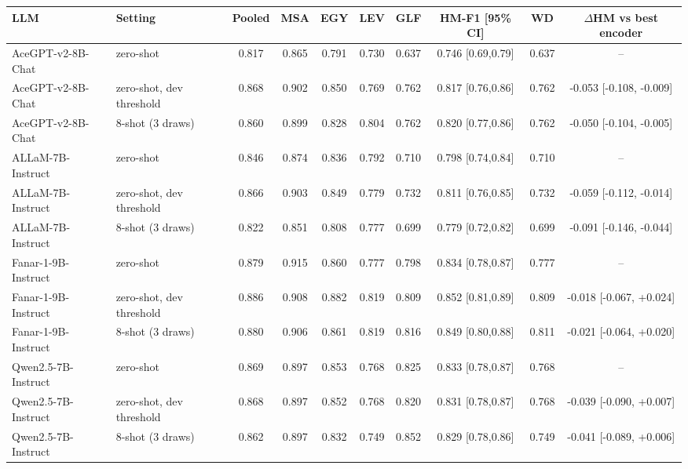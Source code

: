 \begin{tabular}{llccccccc|c}
\toprule
\textbf{LLM} & \textbf{Setting} & Pooled & MSA & EGY & LEV & GLF & HM-F1 [95\% CI] & WD & $\Delta$HM vs best encoder \\
\midrule
AceGPT-v2-8B-Chat & zero-shot & 0.817 & 0.865 & 0.791 & 0.730 & 0.637 & 0.746 {\scriptsize[0.69,0.79]} & 0.637 & -- \\
AceGPT-v2-8B-Chat & zero-shot, dev threshold & 0.868 & 0.902 & 0.850 & 0.769 & 0.762 & 0.817 {\scriptsize[0.76,0.86]} & 0.762 & -0.053 {\scriptsize[-0.108, -0.009]} \\
AceGPT-v2-8B-Chat & 8-shot (3 draws) & 0.860 & 0.899 & 0.828 & 0.804 & 0.762 & 0.820 {\scriptsize[0.77,0.86]} & 0.762 & -0.050 {\scriptsize[-0.104, -0.005]} \\
\midrule
ALLaM-7B-Instruct & zero-shot & 0.846 & 0.874 & 0.836 & 0.792 & 0.710 & 0.798 {\scriptsize[0.74,0.84]} & 0.710 & -- \\
ALLaM-7B-Instruct & zero-shot, dev threshold & 0.866 & 0.903 & 0.849 & 0.779 & 0.732 & 0.811 {\scriptsize[0.76,0.85]} & 0.732 & -0.059 {\scriptsize[-0.112, -0.014]} \\
ALLaM-7B-Instruct & 8-shot (3 draws) & 0.822 & 0.851 & 0.808 & 0.777 & 0.699 & 0.779 {\scriptsize[0.72,0.82]} & 0.699 & -0.091 {\scriptsize[-0.146, -0.044]} \\
\midrule
Fanar-1-9B-Instruct & zero-shot & 0.879 & 0.915 & 0.860 & 0.777 & 0.798 & 0.834 {\scriptsize[0.78,0.87]} & 0.777 & -- \\
Fanar-1-9B-Instruct & zero-shot, dev threshold & 0.886 & 0.908 & 0.882 & 0.819 & 0.809 & 0.852 {\scriptsize[0.81,0.89]} & 0.809 & -0.018 {\scriptsize[-0.067, +0.024]} \\
Fanar-1-9B-Instruct & 8-shot (3 draws) & 0.880 & 0.906 & 0.861 & 0.819 & 0.816 & 0.849 {\scriptsize[0.80,0.88]} & 0.811 & -0.021 {\scriptsize[-0.064, +0.020]} \\
\midrule
Qwen2.5-7B-Instruct & zero-shot & 0.869 & 0.897 & 0.853 & 0.768 & 0.825 & 0.833 {\scriptsize[0.78,0.87]} & 0.768 & -- \\
Qwen2.5-7B-Instruct & zero-shot, dev threshold & 0.868 & 0.897 & 0.852 & 0.768 & 0.820 & 0.831 {\scriptsize[0.78,0.87]} & 0.768 & -0.039 {\scriptsize[-0.090, +0.007]} \\
Qwen2.5-7B-Instruct & 8-shot (3 draws) & 0.862 & 0.897 & 0.832 & 0.749 & 0.852 & 0.829 {\scriptsize[0.78,0.86]} & 0.749 & -0.041 {\scriptsize[-0.089, +0.006]} \\
\bottomrule
\end{tabular}
